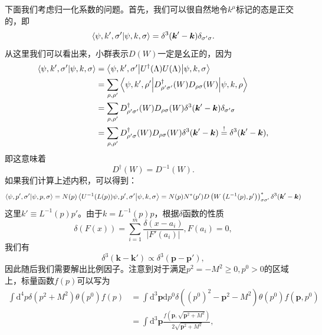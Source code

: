 下面我们考虑归一化系数的问题。首先，我们可以很自然地令$k^{\mu }$标记的态是正交的，即
\begin{equation*}
	\bra{\psi ,k',\sigma '}\ket{\psi ,k,\sigma } =\delta ^{3}(\boldsymbol{k} '-\boldsymbol{k}) \delta _{\sigma '\sigma } .
\end{equation*}
从这里我们可以看出来，小群表示$D( W)$一定是幺正的，因为
\begin{equation*}
	\begin{aligned}
		\bra{\psi ,k',\sigma '}\ket{\psi ,k,\sigma } & =\mel**{\psi ,k',\sigma '}{U^{\dagger }( \Lambda ) U( \Lambda )}{\psi ,k,\sigma }\\
		& =\sum _{\rho ,\rho '}\mel**{\psi ,k',\rho '}{D_{\rho '\sigma '}^{\dagger }( W) D_{\rho \sigma }( W)}{\psi ,k,\rho }\\
		& =\sum _{\rho ,\rho '} D_{\rho '\sigma '}^{\dagger }( W) D_{\rho \sigma }( W) \delta ^{3}(\boldsymbol{k} '-\boldsymbol{k}) \delta _{\sigma '\sigma }\\
		& =\sum _{\rho ,\rho '} D_{\rho '\sigma }^{\dagger }( W) D_{\rho \sigma }( W) \delta ^{3}(\boldsymbol{k} '-\boldsymbol{k})\stackrel{!}{=} \delta ^{3}(\boldsymbol{k} '-\boldsymbol{k}) ,
	\end{aligned}
\end{equation*}
即这意味着
\begin{equation*}
	D^{\dagger }( W) =D^{-1}( W) .
\end{equation*}
如果我们计算上述内积，可以得到：
\begin{equation*}
	\bra{\psi ,p',\sigma '}\ket{\psi ,p,\sigma } =N( p)\bra{U^{-1}( L( p)) \psi ,p',\sigma '}\ket{\psi ,k,\sigma } =N( p) N^{*}( p') D\left( W\left( L^{-1}( p) ,p'\right)\right)_{\sigma \sigma '}^{*} \delta ^{3}(\boldsymbol{k} '-\boldsymbol{k})
\end{equation*}
这里$k'\equiv L^{-1}( p) p'$。由于$k=L^{-1}( p) p$，根据$\delta $函数的性质
\begin{equation*}
	\delta ( F( x)) =\sum _{i=1}^{m}\frac{\delta ( x-a_{i})}{| F'( a_{i})| } ,F( a_{i}) =0,
\end{equation*}
我们有
\begin{equation*}
	\delta ^{3}(\boldsymbol{k} -\boldsymbol{k} ') \varpropto \delta ^{3}(\boldsymbol{p} -\boldsymbol{p} ') ,
\end{equation*}
因此随后我们需要解出比例因子。注意到对于满足$p^{2} =-M^{2} \geq 0,p^{0}  >0$的区域上，标量函数$f( p)$可以写为
\begin{equation*}
	\begin{aligned}
		\int \mathrm{d}^{4} p\delta (p^{2} +M^{2} )\theta (p^{0} )f( p) & =\int \mathrm{d}^{3}\boldsymbol{p}\mathrm{d} p^{0} \delta ((p^{0} )^{2} -\boldsymbol{p}^{2} -M^{2} )\theta (p^{0} )f(\boldsymbol{p} ,p^{0} )\\
		& =\int \mathrm{d}^{3}\boldsymbol{p}\frac{f\left(\boldsymbol{p} ,\sqrt{\boldsymbol{p}^{2} +M^{2}}\right)}{2\sqrt{\boldsymbol{p}^{2} +M^{2}}} ,
	\end{aligned}
\end{equation*}
